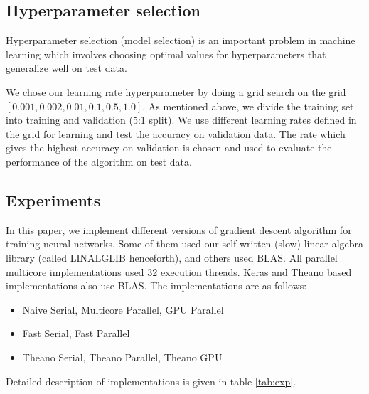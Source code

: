 \subsection{Hyperparameter selection}
\label{sub:hyper_sel}

Hyperparameter selection (model selection) is an important problem in machine learning which involves choosing optimal values for hyperparameters that generalize well on test data.

We chose our learning rate hyperparameter by doing a grid search on the grid $[0.001, 0.002, 0.01, 0.1, 0.5, 1.0]$. As mentioned above, we divide the training set into training and validation (5:1 split). We use different learning rates defined in the grid for learning and test the accuracy on validation data. The rate which gives the highest accuracy on validation is chosen and used to evaluate the performance of the algorithm on test data.

\subsection{Experiments}
\label{sub:exp}
In this paper, we implement different versions of gradient descent algorithm for training neural networks. Some of them used our self-written (slow) linear algebra library (called LINALGLIB henceforth), and others used BLAS. All parallel multicore implementations used 32 execution threads. Keras \cite{Chollet2016} and Theano \cite{Theano2012, Bergstra2010} based implementations also use BLAS. The implementations are as follows:
\begin{itemize}
\vspace{-8pt}
\item Naive Serial, Multicore Parallel, GPU Parallel
\vspace{-4pt}
\item Fast Serial, Fast Parallel
\vspace{-4pt}
\item Theano Serial, Theano Parallel, Theano GPU
\vspace{-8pt}
\end{itemize}
Detailed description of implementations is given in table \ref{tab:exp}.


